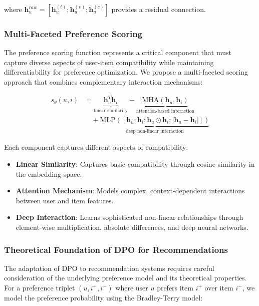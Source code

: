 \documentclass[pdflatex,sn-mathphys-num]{sn-jnl}%
\theoremstyle{thmstyleone}%
\theoremstyle{thmstyletwo}%
\theoremstyle{thmstylethree}%
\begin{document}
where $\mathbf{h}_u^{raw} = [\mathbf{h}_u^{(t)}; \mathbf{h}_u^{(v)}; \mathbf{h}_u^{(c)}]$ provides a residual connection.

\subsubsection{Multi-Faceted Preference Scoring}

The preference scoring function represents a critical component that must capture diverse aspects of user-item compatibility while maintaining differentiability for preference optimization. We propose a multi-faceted scoring approach that combines complementary interaction mechanisms:

\begin{align}
s_{\theta}(u, i) &= \underbrace{\mathbf{h}_u^T \mathbf{h}_i}_{\text{linear similarity}} + \underbrace{\text{MHA}(\mathbf{h}_u, \mathbf{h}_i)}_{\text{attention-based interaction}} \\
&\quad + \underbrace{\text{MLP}([\mathbf{h}_u; \mathbf{h}_i; \mathbf{h}_u \odot \mathbf{h}_i; |\mathbf{h}_u - \mathbf{h}_i|])}_{\text{deep non-linear interaction}}
\end{align}

Each component captures different aspects of compatibility:
\begin{itemize}
\item \textbf{Linear Similarity}: Captures basic compatibility through cosine similarity in the embedding space.
\item \textbf{Attention Mechanism}: Models complex, context-dependent interactions between user and item features.
\item \textbf{Deep Interaction}: Learns sophisticated non-linear relationships through element-wise multiplication, absolute differences, and deep neural networks.
\end{itemize}

\subsubsection{Theoretical Foundation of DPO for Recommendations}

The adaptation of DPO to recommendation systems requires careful consideration of the underlying preference model and its theoretical properties. For a preference triplet $(u, i^+, i^-)$ where user $u$ prefers item $i^+$ over item $i^-$, we model the preference probability using the Bradley-Terry model:
\end{document}
